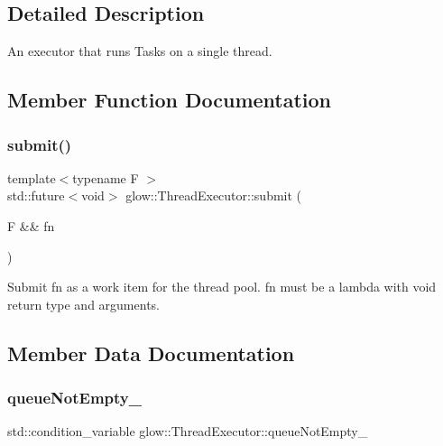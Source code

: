 \subsection{Detailed Description}
An executor that runs Tasks on a single thread. 

\subsection{Member Function Documentation}
\mbox{\label{classglow_1_1_thread_executor_af5cda76c60df09c55b796bda2c2009fc}} 
\subsubsection{\texorpdfstring{submit()}{submit()}}
{\footnotesize\ttfamily template$<$typename F $>$ \\
std\+::future$<$void$>$ glow\+::\+Thread\+Executor\+::submit (\begin{DoxyParamCaption}\item[{F \&\&}]{fn }\end{DoxyParamCaption})\hspace{0.3cm}{\ttfamily [inline]}}

Submit {\ttfamily fn} as a work item for the thread pool. {\ttfamily fn} must be a lambda with void return type and arguments. 

\subsection{Member Data Documentation}
\mbox{\label{classglow_1_1_thread_executor_ad2bd0f888b7c19935724e2ddfbe7706f}} 
\subsubsection{\texorpdfstring{queue\+Not\+Empty\+\_\+}{queueNotEmpty\_}}
{\footnotesize\ttfamily std\+::condition\+\_\+variable glow\+::\+Thread\+Executor\+::queue\+Not\+Empty\+\_\+\hspace{0.3cm}{\ttfamily [protected]}}

